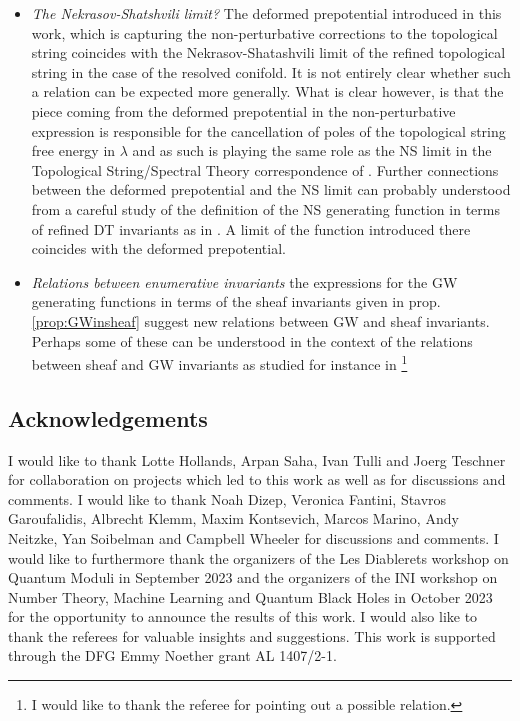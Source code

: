 \documentclass[a4paper,12pt,justification=centering]{article}
\numberwithin{equation}{section}
\theoremstyle{plain}%
\theoremstyle{definition}
\begin{document}
\begin{itemize}
\item \emph{The Nekrasov-Shatshvili limit?} The deformed prepotential introduced in this work, which is capturing the non-perturbative corrections to the topological string coincides with the Nekrasov-Shatashvili limit of the refined topological string in the case of the resolved conifold. It is not entirely clear whether such a relation can be expected more generally. What is clear however, is that the piece coming from the deformed prepotential in the non-perturbative expression is responsible for the cancellation of poles of the topological string free energy in $\lambda$ and as such is playing the same role as the NS limit in the Topological String/Spectral Theory correspondence of \cite{Grassi:2014zfa}. Further connections between the deformed prepotential and the NS limit can probably understood from a careful study of the definition of the NS generating function in terms of refined DT invariants as in \cite{Bousseau:Anomaly}. A limit of the function introduced there coincides with the deformed prepotential.

\item \emph{Relations between enumerative invariants} the expressions for the GW generating functions in terms of the sheaf invariants given in prop. \ref{prop:GWinsheaf} suggest new relations between GW and sheaf invariants. Perhaps some of these can be understood in the context of the relations between sheaf and GW invariants as studied for instance in \cite{Bousseau:Takahashi} \footnote{I would like to thank the referee for pointing out a possible relation.}


\end{itemize}










\subsection*{Acknowledgements}
I would like to thank Lotte Hollands, Arpan Saha, Ivan Tulli and Joerg Teschner for collaboration on projects which led to this work as well as for discussions and comments. I would like to thank Noah Dizep, Veronica Fantini, Stavros Garoufalidis, Albrecht Klemm, Maxim Kontsevich, Marcos Marino,  Andy Neitzke, Yan Soibelman and Campbell Wheeler for discussions and comments. I would like to furthermore thank the organizers of the Les Diablerets workshop on Quantum Moduli in September 2023 and the organizers of the INI workshop on Number Theory, Machine Learning and Quantum Black Holes in October 2023 for the opportunity to announce the results of this work. I would also like to thank the referees for valuable insights and suggestions. This work is supported through the DFG Emmy Noether grant AL 1407/2-1.
\end{document}
